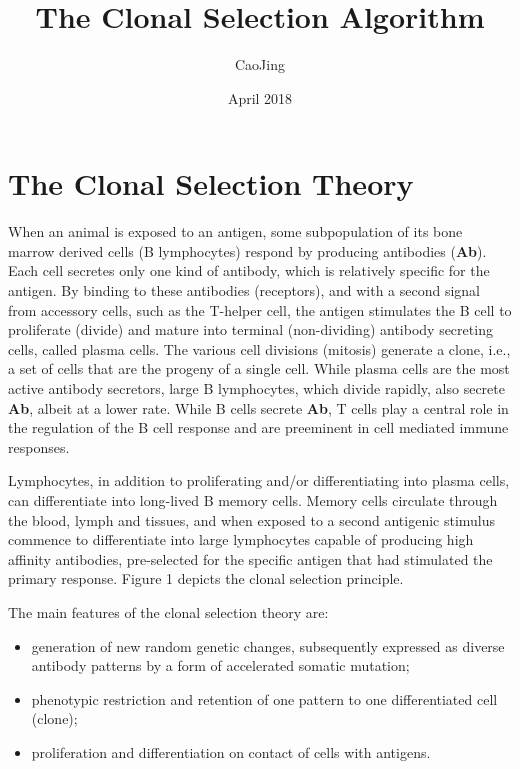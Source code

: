 \documentclass{article}
\title{The Clonal Selection Algorithm}
\author{CaoJing \quad 21721243}
\date{April 2018}
\begin{document}
\maketitle

\section{The Clonal Selection Theory}
When an animal is exposed to an antigen, some subpopulation of its bone marrow derived cells (B lymphocytes) respond by producing antibodies (\textbf{Ab}). Each cell secretes only one kind of antibody, which is relatively specific for the antigen. By binding to these antibodies (receptors), and with a second signal from accessory cells, such as the T-helper cell, the antigen stimulates the B cell to proliferate (divide) and mature into terminal (non-dividing) antibody secreting cells, called plasma cells. The various cell divisions (mitosis) generate a clone, i.e., a set of cells that are the progeny of a single cell. While plasma cells are the most active antibody secretors, large B lymphocytes, which divide rapidly, also secrete \textbf{Ab}, albeit at a lower rate. While B cells secrete \textbf{Ab}, T cells play a central role in the regulation of the B cell response and are preeminent in cell mediated immune responses.

Lymphocytes, in addition to proliferating and/or differentiating into plasma cells, can differentiate into long-lived B memory cells. Memory cells circulate through the blood, lymph and tissues, and when exposed to a second antigenic stimulus commence to differentiate into large lymphocytes capable of producing high affinity antibodies, pre-selected for the specific antigen that had stimulated the primary response. Figure 1 depicts the clonal selection principle.

The main features of the clonal selection theory are:
\begin{itemize}
\item{generation of new random genetic changes, subsequently expressed as diverse antibody patterns by a form of accelerated somatic mutation;}
\item{phenotypic restriction and retention of one pattern to one differentiated cell (clone);}
\item{proliferation and differentiation on contact of cells
with antigens.}
\end{itemize}
\end{document}
